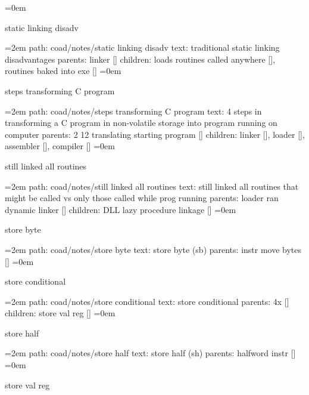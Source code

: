 \smallskip
\leftskip=0em
\par\endgroup
\bigskip
{}
static linking disadv
\smallskip
\par\begingroup
\leftskip=2em
path: coad/notes/static linking disadv
\smallskip
text:  traditional static linking disadvantages
\smallskip
parents:  linker []
\smallskip
children: loads routines called anywhere [], routines baked into exe []
\smallskip
\leftskip=0em
\par\endgroup
\bigskip
{}
steps transforming C program
\smallskip
\par\begingroup
\leftskip=2em
path: coad/notes/steps transforming C program
\smallskip
text:  4 steps in transforming a C program in non-volatile storage into program running on computer
\smallskip
parents:  2 12 translating starting program []
\smallskip
children: linker [], loader [], assembler [], compiler []
\smallskip
\leftskip=0em
\par\endgroup
\bigskip
{}
still linked all routines
\smallskip
\par\begingroup
\leftskip=2em
path: coad/notes/still linked all routines
\smallskip
text:  still linked all routines that might be called vs only those called while prog running
\smallskip
parents:  loader ran dynamic linker []
\smallskip
children: DLL lazy procedure linkage []
\smallskip
\leftskip=0em
\par\endgroup
\bigskip
{}
store byte
\smallskip
\par\begingroup
\leftskip=2em
path: coad/notes/store byte
\smallskip
text:  store byte (sb)
\smallskip
parents:  instr move bytes []
\smallskip
\leftskip=0em
\par\endgroup
\bigskip
{}
store conditional
\smallskip
\par\begingroup
\leftskip=2em
path: coad/notes/store conditional
\smallskip
text:  store conditional
\smallskip
parents:  4x []
\smallskip
children: store val reg []
\smallskip
\leftskip=0em
\par\endgroup
\bigskip
{}
store half
\smallskip
\par\begingroup
\leftskip=2em
path: coad/notes/store half
\smallskip
text:  store half (sh)
\smallskip
parents:  halfword instr []
\smallskip
\leftskip=0em
\par\endgroup
\bigskip
{}
store val reg
\smallskip
\par\begingroup
